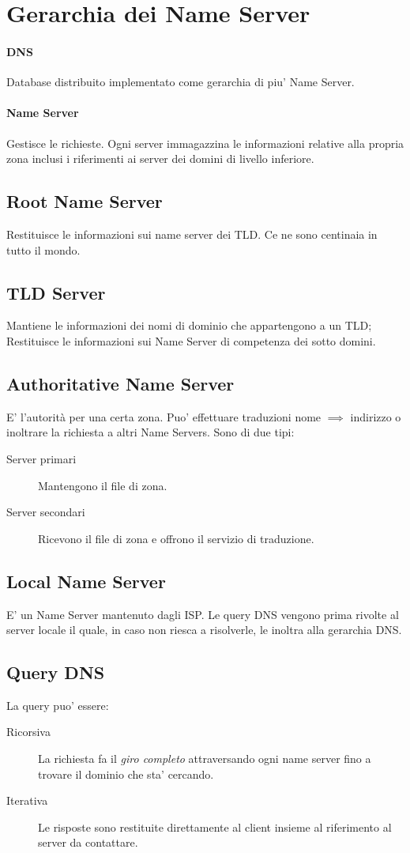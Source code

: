 \section{Gerarchia dei Name Server}
\paragraph{DNS} Database distribuito implementato come gerarchia di piu' Name Server.
\paragraph{Name Server} Gestisce le richieste.
Ogni server immagazzina le informazioni relative alla propria zona inclusi i riferimenti ai server dei domini di livello inferiore.
\subsection{Root Name Server}
Restituisce le informazioni sui name server dei TLD. Ce ne sono centinaia in tutto il mondo.
\subsection{TLD Server}
Mantiene le informazioni dei nomi di dominio che appartengono a un TLD; Restituisce le informazioni sui Name Server di competenza dei sotto domini.
\subsection{Authoritative Name Server} %
E' l'autorità per una certa zona. Puo' effettuare traduzioni nome $\implies$ indirizzo o inoltrare la richiesta a altri Name Servers.
Sono di due tipi:
\begin{description}
    \item[Server primari] Mantengono il file di zona.
    \item[Server secondari] Ricevono il file di zona e offrono il servizio di traduzione. 
\end{description}
\subsection{Local Name Server}
E' un Name Server mantenuto dagli ISP.
Le query DNS vengono prima rivolte al server locale il quale, in caso non riesca a risolverle, le inoltra alla gerarchia DNS.
\subsection{Query DNS}
La query puo' essere:
\begin{description}
    \item[Ricorsiva] La richiesta fa il \textit{giro completo} attraversando ogni name server fino a trovare il dominio che sta' cercando.
    \item[Iterativa] Le risposte sono restituite direttamente al client insieme al riferimento al server da contattare.
\end{description}
